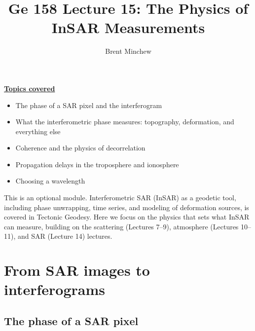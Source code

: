 \documentclass[11pt, oneside]{article}
\title{Ge 158 Lecture 15: The Physics of InSAR Measurements}
\author{Brent Minchew}
\date{}
\begin{document}
\maketitle

\noindent\underline{\textbf{Topics covered}}
\begin{itemize}
	\item The phase of a SAR pixel and the interferogram
	\item What the interferometric phase measures: topography, deformation, and everything else
	\item Coherence and the physics of decorrelation
	\item Propagation delays in the troposphere and ionosphere
	\item Choosing a wavelength
\end{itemize}

\noindent This is an optional module. Interferometric SAR (InSAR) as a geodetic tool, including phase unwrapping, time series, and modeling of deformation sources, is covered in Tectonic Geodesy. Here we focus on the physics that sets what InSAR can measure, building on the scattering (Lectures 7--9), atmosphere (Lectures 10--11), and SAR (Lecture 14) lectures.

\section{From SAR images to interferograms}
\label{s:interferogram}

\subsection{The phase of a SAR pixel}
\end{document}
